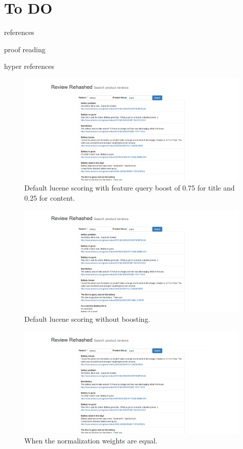\documentclass{article}
\begin{document}
\section{To DO}
\begin{description}
\item references
\item proof reading
\item hyper references

\begin{figure}[ht!]
  \centering
  \includegraphics[width=1\textwidth]{noscoring}
  \caption{Default lucene scoring with feature query boost of 0.75 for title and 0.25 for content.~\label{fig:Search_Engine}}
\end{figure}

\begin{figure}[ht!]
  \centering
  \includegraphics[width=1\textwidth]{noboosting}
  \caption{Default lucene scoring without boosting.~\label{fig:Search_Engine}}
\end{figure}

\begin{figure}[ht!]
  \centering
  \includegraphics[width=1\textwidth]{equal_weights}
  \caption{When the normalization weights are equal.~\label{fig:Search_Engine}}
\end{figure}


\end{description}
\end{document}
